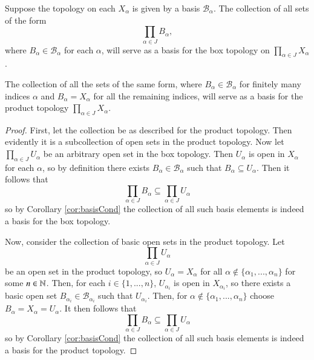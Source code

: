 \documentclass[12pt, a4paper, oneside, openright, titlepage]{book}
\begin{document}
\begin{theorem}
    Suppose the topology on each $X_{\alpha}$ is given by a basis $\mathcal{B}_{\alpha}$. The collection of all sets of the form \begin{equation*}
        \prod\limits_{\alpha \in J}B_{\alpha},
    \end{equation*}
    where $B_{\alpha} \in \mathcal{B}_{\alpha}$ for each $\alpha$, will serve as a basis for the box topology on $\prod_{\alpha \in J}X_{\alpha}$.

    The collection of all the sets of the same form, where $B_{\alpha} \in \mathcal{B}_{\alpha}$ for finitely many indices $\alpha$ and $B_{\alpha} = X_{\alpha}$ for all the remaining indices, will serve as a basis for the product topology $\prod_{\alpha \in J}X_{\alpha}$.
\end{theorem}
\begin{proof}
    First, let the collection be as described for the product topology. Then evidently it is a subcollection of open sets in the product topology. Now let $\prod_{\alpha \in J}U_{\alpha}$ be an arbitrary open set in the box topology. Then $U_{\alpha}$ is open in $X_{\alpha}$ for each $\alpha$, so by definition there exists $B_{\alpha} \in \mathcal{B}_{\alpha}$ such that $B_{\alpha} \subseteq U_{\alpha}$. Then it follows that \begin{equation*}
        \prod\limits_{\alpha \in J}B_{\alpha} \subseteq \prod\limits_{\alpha \in J}U_{\alpha}
    \end{equation*}
    so by Corollary \ref{cor:basisCond} the collection of all such basis elements is indeed a basis for the box topology.

    Now, consider the collection of basic open sets in the product topology. Let $$\prod\limits_{\alpha \in J}U_{\alpha}$$ be an open set in the product topology, so $U_{\alpha} = X_{\alpha}$ for all $\alpha \notin \{\alpha_1,...,\alpha_n\}$ for some $n \in \mathbb N$. Then, for each $i \in \{1,...,n\}$, $U_{\alpha_i}$ is open in $X_{\alpha_i}$, so there exists a basic open set $B_{\alpha_i} \in \mathcal{B}_{\alpha_i}$ such that $U_{\alpha_i}$. Then, for $\alpha \notin \{\alpha_1,...,\alpha_n\}$ choose $B_{\alpha} = X_{\alpha} = U_{\alpha}$. It then follows that \begin{equation*}
        \prod\limits_{\alpha \in J}B_{\alpha} \subseteq \prod\limits_{\alpha \in J}U_{\alpha}
    \end{equation*}
    so by Corollary \ref{cor:basisCond} the collection of all such basis elements is indeed a basis for the product topology.
\end{proof}
\end{document}
